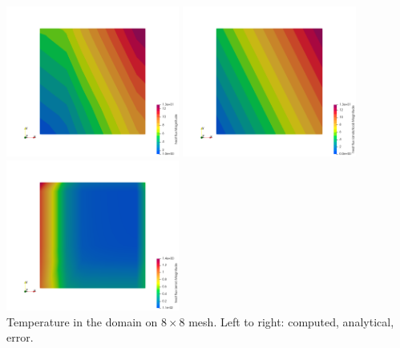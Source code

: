 \begin{center}
\includegraphics[width=5.7cm]{python_codes/fieldstone_173/results/exp1/q8}
\includegraphics[width=5.7cm]{python_codes/fieldstone_173/results/exp1/q8_analytical}
\includegraphics[width=5.7cm]{python_codes/fieldstone_173/results/exp1/q8_error}\\
{\captionfont Temperature in the domain on $8 \times 8$ mesh. Left to right:
computed, analytical, error.}
\end{center}

